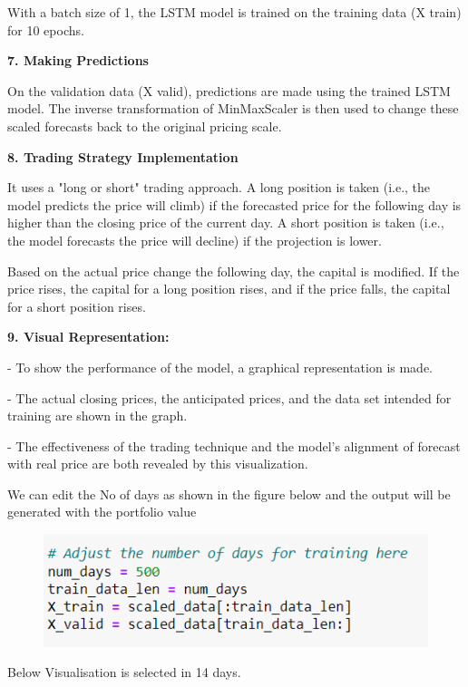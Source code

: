 With a batch size of 1, the LSTM model is trained on the training data (X train) for 10 epochs.

\textbf{7. Making Predictions}

On the validation data (X valid), predictions are made using the trained LSTM model.
The inverse transformation of MinMaxScaler is then used to change these scaled forecasts back to the original pricing scale.

\textbf{8. Trading Strategy Implementation}

It uses a "long or short" trading approach. A long position is taken (i.e., the model predicts the price will climb) if the forecasted price for the following day is higher than the closing price of the current day. A short position is taken (i.e., the model forecasts the price will decline) if the projection is lower.

Based on the actual price change the following day, the capital is modified. If the price rises, the capital for a long position rises, and if the price falls, the capital for a short position rises.



\textbf{9. Visual Representation:} 

- To show the performance of the model, a graphical representation is made.

- The actual closing prices, the anticipated prices, and the data set intended for training are shown in the graph.

- The effectiveness of the trading technique and the model's alignment of forecast with real price are both revealed by this visualization. 

We can edit the No of days as shown in the figure below and the output will be generated with the portfolio value 

\begin{figure}[H]
\centering
\includegraphics[scale=0.65]{fig15.jpg}
\end{figure}

Below Visualisation is selected in 14 days.

